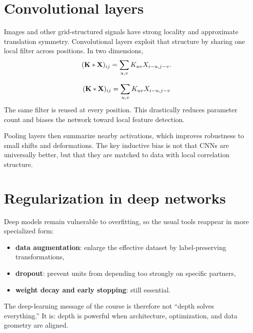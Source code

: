 \section{Convolutional layers}

Images and other grid-structured signals have strong locality and approximate translation symmetry. Convolutional layers exploit that structure by sharing one local filter across positions. In two dimensions,
\[
  (\mathbf{K} * \mathbf{X})_{ij}
  =
  \sum_{u,v} K_{uv} X_{i-u,j-v}.
\]

\begin{keyequation}
\[
  (\mathbf{K} * \mathbf{X})_{ij}
  =
  \sum_{u,v} K_{uv} X_{i-u,j-v}
\]
\tcblower
The same filter is reused at every position. This drastically reduces parameter count and biases the network toward local feature detection.
\end{keyequation}

Pooling layers then summarize nearby activations, which improves robustness to small shifts and deformations. The key inductive bias is not that CNNs are universally better, but that they are matched to data with local correlation structure.

\section{Regularization in deep networks}

Deep models remain vulnerable to overfitting, so the usual tools reappear in more specialized form:
\begin{itemize}
  \item \textbf{data augmentation}: enlarge the effective dataset by label-preserving transformations,
  \item \textbf{dropout}: prevent units from depending too strongly on specific partners,
  \item \textbf{weight decay and early stopping}: still essential.
\end{itemize}

The deep-learning message of the course is therefore not ``depth solves everything.'' It is: depth is powerful when architecture, optimization, and data geometry are aligned.
